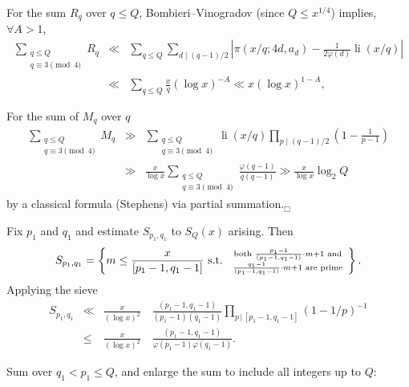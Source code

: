 \documentclass[landscape]{powersem} %
\newcommand{\li}{\operatorname{li}}
\newcommand{\heading}[1]{%
 \begin{center}
  \large\bf
  \shadowbox{{\textcolor{conceptcolor}{#1}}}%
 \end{center}
 \vspace{1ex minus 1ex}}
\begin{document}
\begin{slide}

For the sum $R_q$ over $q\le Q$,
Bombieri--Vinogradov (since $Q\leq x^{1/4}$) implies, $\forall A > 1$,\vspace{-5mm}\pause
\begin{eqnarray*}
\sum_{\substack{q\leq Q\\ q\equiv3\pmod4}}R_q &\ll&\sum_{q\leq
Q}\sum_{d\mid (q-1)/2}\left|
\pi(x/q;4d,a_d)-\frac1{2\varphi(d)}\li(x/q)\right|\\
&\ll& \sum_{q\leq Q} \frac{x}{q} (\log x)^{-A} \ll x(\log x)^{1-A},
\end{eqnarray*}\vspace{-3mm}\pause

For the sum of  $M_q$  over $q$\vspace{-3mm}
\begin{eqnarray*}
\sum_{\substack{q\leq Q\\ q\equiv3\pmod4}}M_q
&\gg&\sum_{\substack{q\leq Q\\ q\equiv3\pmod4}}
\li(x/q)\prod_{p\mid(q-1)/2}\left(1-\frac{1}{p-1}\right)\\
&\gg&\frac{x}{\log x} \sum_{\substack{q\leq Q\\ q\equiv3\pmod4}}
\frac{\varphi(q-1)}{q(q-1)}\gg \frac x{\log
x}\log_2 Q
\end{eqnarray*}\vspace{-2mm}\pause
by a classical formula (Stephens) via partial summation.\hfill$_\Box$

\end{slide}

\begin{slide}

\heading{Proof of Lemma \ref{due}}

Fix $p_1$ and $q_1$ and estimate $S_{p_1,q_1}$ to
$S_Q(x)$ arising. \pause Then
$$S_{p_1,q_1}=\left\{m\le \frac x{[p_1-1,q_1-1]}\ \text{s.t. }\
\genfrac{}{}{0pt}{1}{\text{both }\frac{p_1-1}{(p_1-1,q_1-1)}\cdot m + 1 \text{ and}} {\frac{q_1-1}{(p_1-1,q_1-1)}\cdot m + 1
\text{ are prime}}\
\right\}.$$\pause  Applying the sieve
\begin{eqnarray*}
S_{p_1,q_1} &\ll& \frac {x}{(\log x)^2} \quad
\frac{(p_1-1,q_1-1)}{(p_1-1)(q_1-1)}
\prod_{p\,|\,[p_1-1,q_1-1]}(1-1/p)^{-1}\\
& \le & \frac {x}{(\log x)^2} \quad
\frac{(p_1-1,q_1-1)}{\varphi(p_1-1)\varphi(q_1-1)}.
\end{eqnarray*}\pause

Sum over $q_1<p_1\le Q$, and enlarge the sum to include all
integers up to $Q$:\end{slide}
\end{document}
